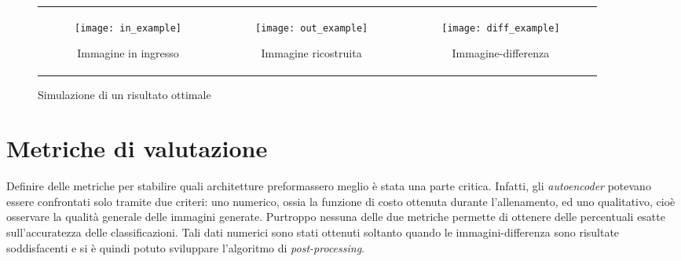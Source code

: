 \begin{figure}[ht] %
  \begin{center}
    \begin{tabular}{ccc}

      \begin{subfigure}{.3\linewidth}
        \centering\texttt{[image: in\_example]}
        \caption{Immagine in ingresso}
        \label{fig:obbiettivo_in}
      \end{subfigure} &

      \begin{subfigure}{.3\linewidth}
        \centering\texttt{[image: out\_example]}

        \caption{Immagine ricostruita}
        \label{fig:obbiettivo_out}
      \end{subfigure} &

      \begin{subfigure}{.3\linewidth}
        \centering\texttt{[image: diff\_example]}
        \caption{Immagine-differenza}
        \label{fig:obbiettivo_diff}
      \end{subfigure}

    \end{tabular}
    \caption{Simulazione di un risultato ottimale}
    \label{fig:obbiettivo_in_out_diff}
  \end{center}
\end{figure}

\section{Metriche di valutazione}
Definire delle metriche per stabilire quali architetture preformassero meglio è stata una parte critica.
Infatti, gli \textit{autoencoder} potevano essere confrontati solo tramite due criteri: uno numerico, ossia la funzione di costo ottenuta durante l'allenamento, ed uno qualitativo, cioè osservare la qualità generale delle immagini generate.
Purtroppo nessuna delle due metriche permette di ottenere delle percentuali esatte sull'accuratezza delle classificazioni.
Tali dati numerici sono stati ottenuti soltanto quando le immagini-differenza sono risultate soddisfacenti e si è quindi potuto sviluppare l'algoritmo di \textit{post-processing}.

